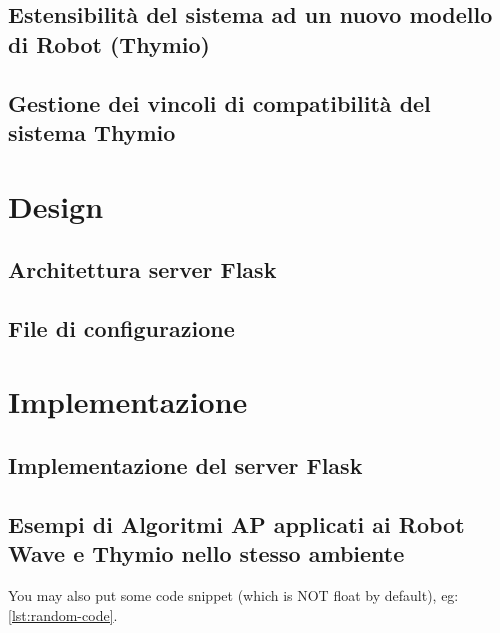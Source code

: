 \documentclass[12pt,a4paper,openright,twoside]{book}
\begin{document}
\section{Estensibilità del sistema ad un nuovo modello di Robot (Thymio)}

\section{Gestione dei vincoli di compatibilità del sistema Thymio}


\chapter{Design}
\label{chap:design}

\section{Architettura server Flask}

\section{File di configurazione}

\chapter{Implementazione}
\label{chap:implementazione}

\section{Implementazione del server Flask}

\section{Esempi di Algoritmi AP applicati ai Robot Wave e Thymio nello stesso ambiente}

You may also put some code snippet (which is NOT float by default), eg: \cref{lst:random-code}.


\end{document}

